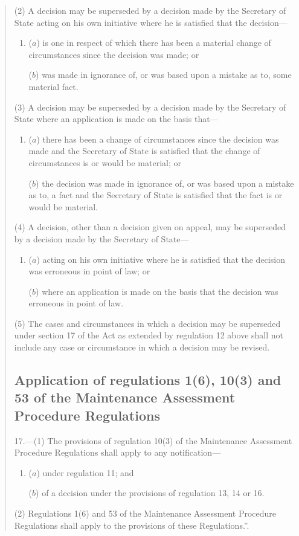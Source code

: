 \documentclass[12pt,a4paper]{article}
\begin{document}
\begin{quotation}
(2) A decision may be superseded by a decision made by the Secretary of State acting on his own initiative where he is satisfied that the decision—
\begin{enumerate}\item[]
($a$) is one in respect of which there has been a material change of circumstances since the decision was made; or

($b$) was made in ignorance of, or was based upon a mistake as to, some material fact.
\end{enumerate}

(3) A decision may be superseded by a decision made by the Secretary of State where an application is made on the basis that—
\begin{enumerate}\item[]
($a$) there has been a change of circumstances since the decision was made and the Secretary of State is satisfied that the change of circumstances is or would be material; or

($b$) the decision was made in ignorance of, or was based upon a mistake as to, a fact and the Secretary of State is satisfied that the fact is or would be material.
\end{enumerate}

(4) A decision, other than a decision given on appeal, may be superseded by a decision made by the Secretary of State—
\begin{enumerate}\item[]
($a$) acting on his own initiative where he is satisfied that the decision was erroneous in point of law; or

($b$) where an application is made on the basis that the decision was erroneous in point of law.
\end{enumerate}

(5) The cases and circumstances in which a decision may be superseded under section 17 of the Act as extended by regulation 12 above shall not include any case or circumstance in which a decision may be revised.

\subsection*{Application of regulations 1(6), 10(3) and 53 of the Maintenance Assessment Procedure Regulations}

17.—(1) The provisions of regulation 10(3) of the Maintenance Assessment Procedure Regulations shall apply to any notification—
\begin{enumerate}\item[]
($a$) under regulation 11; and

($b$) of a decision under the provisions of regulation 13, 14 or 16.
\end{enumerate}

(2) Regulations 1(6) and 53 of the Maintenance Assessment Procedure Regulations shall apply to the provisions of these Regulations.”.
\end{quotation}
\end{document}

